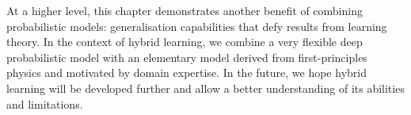 At a higher level, this chapter demonstrates another benefit of combining probabilistic models: generalisation capabilities that defy results from learning theory. In the context of hybrid learning, we combine a very flexible deep probabilistic model with an elementary model derived from first-principles physics and motivated by domain expertise. In the future, we hope hybrid learning will be developed further and allow a better understanding of its abilities and limitations.
